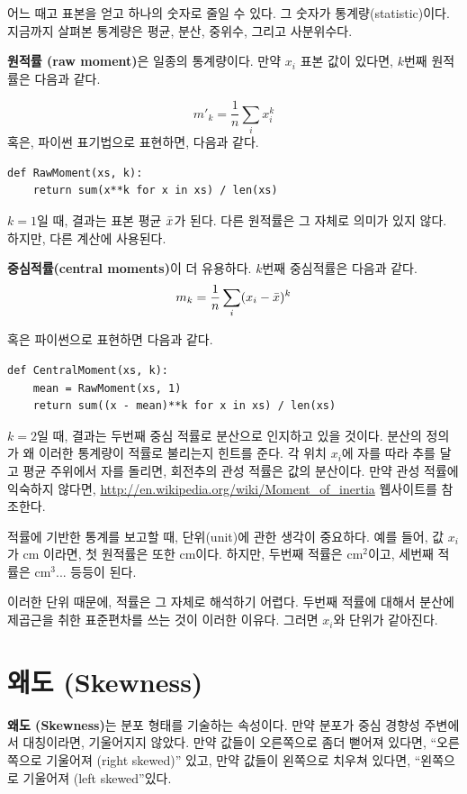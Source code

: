 어느 때고 표본을 얻고 하나의 숫자로 줄일 수 있다. 그 숫자가 통계량(statistic)이다.
지금까지 살펴본 통계량은 평균, 분산, 중위수, 그리고 사분위수다.

{\bf 원적률 (raw moment)}은 일종의 통계량이다. 만약 $x_i$ 표본 값이 있다면,
$k$번째 원적률은 다음과 같다.

%
\[ m'_k = \frac{1}{n} \sum_i x_i^k \]
%
혹은, 파이썬 표기법으로 표현하면, 다음과 같다.

\begin{verbatim}
def RawMoment(xs, k):
    return sum(x**k for x in xs) / len(xs)
\end{verbatim}

$k=1$일 때, 결과는 표본 평균 $\bar{x}$가 된다.
다른 원적률은 그 자체로 의미가 있지 않다. 하지만, 다른 계산에 사용된다.

{\bf 중심적률(central moments)}이 더 유용하다. 
$k$번째 중심적률은 다음과 같다.
%
\[ m_k = \frac{1}{n} \sum_i (x_i - \bar{x})^k \]
%

혹은 파이썬으로 표현하면 다음과 같다.

\begin{verbatim}
def CentralMoment(xs, k):
    mean = RawMoment(xs, 1)
    return sum((x - mean)**k for x in xs) / len(xs)
\end{verbatim}

$k=2$일 때, 결과는 두번째 중심 적률로 분산으로 인지하고 있을 것이다.
분산의 정의가 왜 이러한 통계량이 적률로 불리는지 힌트를 준다.
각 위치 $x_i$에 자를 따라 추를 달고 평균 주위에서 자를 돌리면, 
회전추의 관성 적률은 값의 분산이다. 만약 관성 적률에 익숙하지 않다면,
\url{http://en.wikipedia.org/wiki/Moment_of_inertia} 웹사이트를 참조한다.  

적률에 기반한 통계를 보고할 때, 단위(unit)에 관한 생각이 중요하다.
예를 들어, 값 $x_i$가 cm 이라면, 첫 원적률은 또한 cm이다.
하지만, 두번째 적률은 cm$^2$이고, 세번째 적률은 cm$^3$... 등등이 된다.

이러한 단위 때문에, 적률은 그 자체로 해석하기 어렵다.
두번째 적률에 대해서 분산에 제곱근을 취한 표준편차를 쓰는 것이 이러한 이유다. 
그러면 $x_i$와 단위가 같아진다.


\section{왜도 (Skewness)}

{\bf 왜도 (Skewness)}는 분포 형태를 기술하는 속성이다. 
만약 분포가 중심 경향성 주변에서 대칭이라면, 기울어지지 않았다.
만약 값들이 오른쪽으로 좀더 뻗어져 있다면, ``오른쪽으로 기울어져 (right
skewed)'' 있고, 만약 값들이 왼쪽으로 치우쳐 있다면, ``왼쪽으로 기울어져 (left
skewed''있다.

